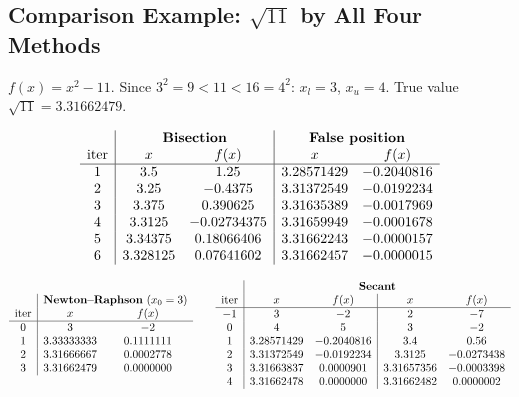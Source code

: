 \documentclass[hidelinks]{article}
\begin{document}
\subsection{Comparison Example: $\sqrt{11}$ by All Four Methods}

$f(x)=x^2-11$. Since $3^2=9<11<16=4^2$: $x_l=3$, $x_u=4$. True value $\sqrt{11}=3.31662479$.

\[
\begin{array}{c|cc|cc}
 & \multicolumn{2}{c|}{\textbf{Bisection}} & \multicolumn{2}{c}{\textbf{False position}}\\
\text{iter} & x & f(x) & x & f(x)\\ \hline
1 & 3.5 & 1.25 & 3.28571429 & -0.2040816\\
2 & 3.25 & -0.4375 & 3.31372549 & -0.0192234\\
3 & 3.375 & 0.390625 & 3.31635389 & -0.0017969\\
4 & 3.3125 & -0.02734375 & 3.31659949 & -0.0001678\\
5 & 3.34375 & 0.18066406 & 3.31662243 & -0.0000157\\
6 & 3.328125 & 0.07641602 & 3.31662457 & -0.0000015\\
\end{array}
\]

\[
\begin{array}{c|cc}
 & \multicolumn{2}{c}{\textbf{Newton--Raphson}\ (x_0=3)}\\
\text{iter} & x & f(x)\\ \hline
0 & 3 & -2\\
1 & 3.33333333 & 0.1111111\\
2 & 3.31666667 & 0.0002778\\
3 & 3.31662479 & 0.0000000\\
\end{array}
\qquad
\begin{array}{c|cc|cc}
 & \multicolumn{4}{c}{\textbf{Secant}}\\
\text{iter} & x & f(x) & x & f(x)\\ \hline
-1 & 3 & -2 & 2 & -7\\
0 & 4 & 5 & 3 & -2\\
1 & 3.28571429 & -0.2040816 & 3.4 & 0.56\\
2 & 3.31372549 & -0.0192234 & 3.3125 & -0.0273438\\
3 & 3.31663837 & 0.0000901 & 3.31657356 & -0.0003398\\
4 & 3.31662478 & 0.0000000 & 3.31662482 & 0.0000002\\
\end{array}
\]
\end{document}
